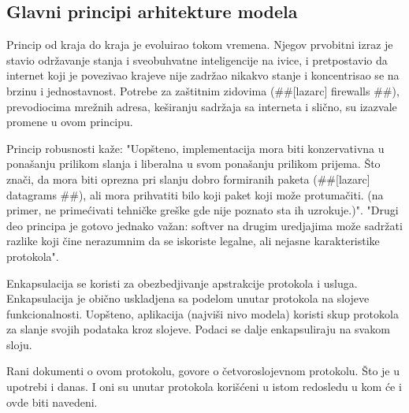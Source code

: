 \documentclass[a4paper,12pt, master]{etf}
\begin{document}
        \subsection{Glavni principi arhitekture modela}

	Princip od kraja do kraja je evoluirao tokom vremena. Njegov prvobitni izraz je stavio
	odr\v{z}avanje stanja i sveobuhvatne inteligencije na ivice, i pretpostavio da internet koji je
	povezivao krajeve nije zadr\v{z}ao nikakvo stanje i koncentrisao se na brzinu i jednostavnost.
	Potrebe za za\v{s}titnim zidovima (\#\#[lazarc] firewalls \#\#), prevodiocima mre\v{z}nih adresa,
	ke\v{s}iranju sadr\v{z}aja sa interneta i sli\v{c}no, su izazvale promene u ovom principu.

	Princip robusnosti ka\v{z}e: "Uop\v{s}teno, implementacija mora biti konzervativna u pona\v{s}anju
	prilikom slanja i liberalna u svom pona\v{s}anju prilikom prijema. \v{S}to zna\v{c}i, da mora biti
	oprezna pri slanju dobro formiranih paketa (\#\#[lazarc] datagrams \#\#), ali mora
	prihvatiti bilo koji paket koji mo\v{z}e protuma\v{c}iti. (na primer, ne prime\'{c}ivati tehni\v{c}ke gre\v{s}ke
	gde nije poznato sta ih uzrokuje.)". "Drugi deo principa je gotovo jednako va\v{z}an: softver na
	drugim uredjajima mo\v{z}e sadr\v{z}ati razlike koji \v{c}ine nerazumnim da se iskoriste legalne, ali
	nejasne karakteristike protokola".

	Enkapsulacija se koristi za obezbedjivanje apstrakcije protokola i usluga. Enkapsulacija je
	obi\v{c}no uskladjena sa podelom unutar protokola na slojeve funkcionalnosti. Uop\v{s}teno,
	aplikacija (najvi\v{s}i nivo modela) koristi skup protokola za slanje svojih podataka kroz
	slojeve. Podaci se dalje enkapsuliraju na svakom sloju.

	Rani dokumenti o ovom protokolu, govore o \v{c}etvoroslojevnom protokolu. \v{S}to je u upotrebi i
	danas. I oni su unutar protokola kori\v{s}\'{c}eni u istom redosledu u kom \'{c}e i ovde biti navedeni.
\end{document}
